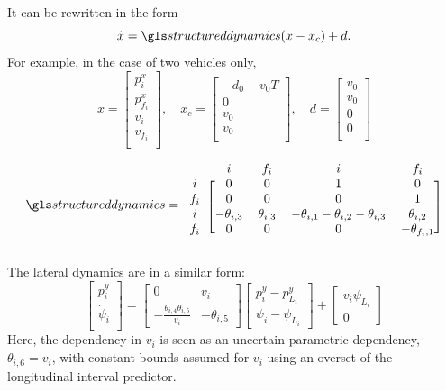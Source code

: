 It can be rewritten in the form $$\dot{x} = \structureddynamics(x-x_c) + d.$$ For example, in the case of two vehicles only,
\begin{equation*}
x = \begin{bmatrix}
p^x_i \\
p^x_{f_i} \\
v_i \\
v_{f_i} \\
\end{bmatrix}
,\quad
x_c = \begin{bmatrix}
-d_0-v_0 T \\
0 \\
v_0\\
v_0 \\
\end{bmatrix}
,\quad
d = \begin{bmatrix}
v_0 \\
v_0 \\
0\\
0\\
\end{bmatrix}
\end{equation*}

\begin{equation*}
\structureddynamics
=
\begin{blockarray}{ccccc}
& i & f_i & i & f_i \\
\begin{block}{c[cccc]}
i & 0 & 0 & 1 & 0 \\
f_i & 0 & 0 & 0 & 1 \\
i & -\theta_{i,3} & \theta_{i,3} & -\theta_{i,1}-\theta_{i,2}-\theta_{i,3} & \theta_{i,2} \\
f_i & 0 & 0 & 0 & -\theta_{f_i,1} \\
\end{block}
\end{blockarray}
\end{equation*}

The lateral dynamics are in a similar form:
\begin{equation*}
\begin{bmatrix}
\dot{p}^y_i \\
\dot{\psi}_i \\
\end{bmatrix}
=
\begin{bmatrix}
0 & v_i \\
-\frac{\theta_{i,4} \theta_{i,5}}{v_i} & -\theta_{i,5}
\end{bmatrix}
\begin{bmatrix}
p^y_i - p^y_{L_i} \\
\psi_i - \psi_{L_i}
\end{bmatrix}
+
\begin{bmatrix}
v_i\psi_{L_i} \\
0
\end{bmatrix}
\end{equation*}
Here, the dependency in $v_i$ is seen as an uncertain parametric dependency, \ie $\theta_{i,6}=v_i$, with constant bounds assumed for $v_i$ using an overset of the longitudinal interval predictor.

